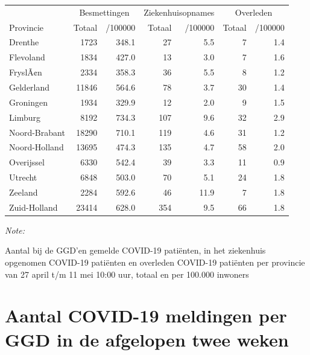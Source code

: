 \documentclass[
  english,
  man,floatsintext]{apa6}
\begin{document}
\begin{table}
\centering
\begin{threeparttable}
\begin{tabular}{lrrrrrr}
\toprule
\multicolumn{1}{c}{ } & \multicolumn{2}{c}{Besmettingen} & \multicolumn{2}{c}{Ziekenhuisopnames} & \multicolumn{2}{c}{Overleden} \\
\cmidrule(l{3pt}r{3pt}){2-3} \cmidrule(l{3pt}r{3pt}){4-5} \cmidrule(l{3pt}r{3pt}){6-7}
Provincie & Totaal & /100000 & Totaal & /100000 & Totaal & /100000\\
\midrule
Drenthe & 1723 & 348.1 & 27 & 5.5 & 7 & 1.4\\
Flevoland & 1834 & 427.0 & 13 & 3.0 & 7 & 1.6\\
FryslÃ¢n & 2334 & 358.3 & 36 & 5.5 & 8 & 1.2\\
Gelderland & 11846 & 564.6 & 78 & 3.7 & 30 & 1.4\\
Groningen & 1934 & 329.9 & 12 & 2.0 & 9 & 1.5\\
Limburg & 8192 & 734.3 & 107 & 9.6 & 32 & 2.9\\
Noord-Brabant & 18290 & 710.1 & 119 & 4.6 & 31 & 1.2\\
Noord-Holland & 13695 & 474.3 & 135 & 4.7 & 58 & 2.0\\
Overijssel & 6330 & 542.4 & 39 & 3.3 & 11 & 0.9\\
Utrecht & 6848 & 503.0 & 70 & 5.1 & 24 & 1.8\\
Zeeland & 2284 & 592.6 & 46 & 11.9 & 7 & 1.8\\
Zuid-Holland & 23414 & 628.0 & 354 & 9.5 & 66 & 1.8\\
\bottomrule
\end{tabular}
\begin{tablenotes}
\item \textit{Note: } 
\item Aantal bij de GGD’en gemelde COVID-19 patiënten, in het ziekenhuis opgenomen COVID-19 patiënten en overleden COVID-19 patiënten per provincie van 27 april t/m 11 mei 10:00 uur, totaal en per 100.000 inwoners
\end{tablenotes}
\end{threeparttable}
\end{table}

\newpage

\hypertarget{aantal-covid-19-meldingen-per-ggd-in-de-afgelopen-twee-weken}{%
\section{Aantal COVID-19 meldingen per GGD in de afgelopen twee weken}\label{aantal-covid-19-meldingen-per-ggd-in-de-afgelopen-twee-weken}}
\end{document}
